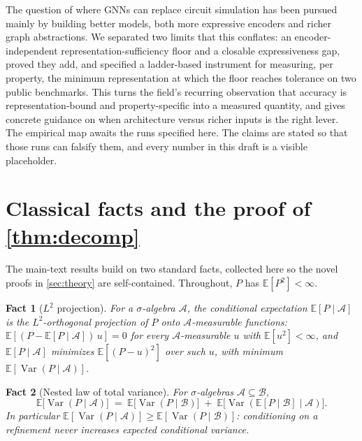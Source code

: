 \documentclass[10pt]{article}
\newtheorem{fact}{Fact}
\newcommand{\E}{\mathbb{E}}
\newcommand{\Var}{\operatorname{Var}}
\begin{document}
The question of where GNNs can replace circuit simulation has been pursued mainly by building better models, both more expressive encoders and richer graph abstractions. We separated two limits that this conflates: an encoder-independent representation-sufficiency floor and a closable expressiveness gap, proved they add, and specified a ladder-based instrument for measuring, per property, the minimum representation at which the floor reaches tolerance on two public benchmarks. This turns the field's recurring observation that accuracy is representation-bound and property-specific into a measured quantity, and gives concrete guidance on when architecture versus richer inputs is the right lever. The empirical map awaits the runs specified here. The claims are stated so that those runs can falsify them, and every number in this draft is a visible placeholder.




\appendix
\section{Classical facts and the proof of \cref{thm:decomp}}
\label{app:proof}

The main-text results build on two standard facts, collected here so the novel proofs in \cref{sec:theory} are self-contained. Throughout, $P$ has $\E[P^2]<\infty$.

\begin{fact}[$L^2$ projection]
\label{fact:proj}
For a $\sigma$-algebra $\mathcal{A}$, the conditional expectation $\E[P\mid\mathcal{A}]$ is the $L^2$-orthogonal projection of $P$ onto $\mathcal{A}$-measurable functions: $\E[(P-\E[P\mid\mathcal{A}])\,u]=0$ for every $\mathcal{A}$-measurable $u$ with $\E[u^2]<\infty$, and $\E[P\mid\mathcal{A}]$ minimizes $\E[(P-u)^2]$ over such $u$, with minimum $\E[\Var(P\mid\mathcal{A})]$.
\end{fact}

\begin{fact}[Nested law of total variance]
\label{fact:ltv}
For $\sigma$-algebras $\mathcal{A}\subseteq\mathcal{B}$,
\[
\E\!\big[\Var(P\mid\mathcal{A})\big] \;=\; \E\!\big[\Var(P\mid\mathcal{B})\big] \;+\; \E\!\big[\Var(\E[P\mid\mathcal{B}]\mid\mathcal{A})\big].
\]
In particular $\E[\Var(P\mid\mathcal{A})]\ge\E[\Var(P\mid\mathcal{B})]$: conditioning on a refinement never increases expected conditional variance.
\end{fact}
\end{document}
